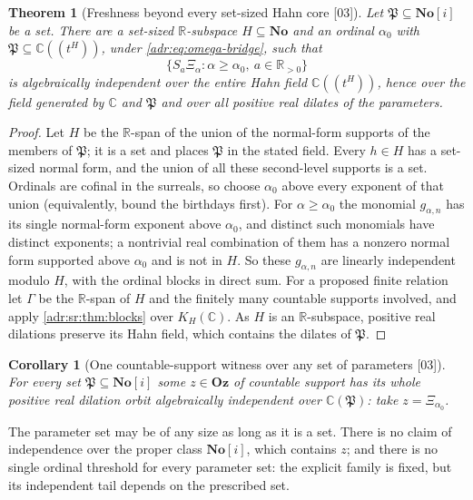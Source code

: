 \documentclass[11pt,letterpaper]{article}
\numberwithin{equation}{section}
\newtheorem{theorem}{Theorem}[section]
\newtheorem{corollary}[corollary]{Corollary}
\theoremstyle{definition}
\theoremstyle{remark}
\newcommand{\No}{\mathbf{No}}
\newcommand{\Oz}{\mathbf{Oz}}
\newcommand{\SC}{\mathbf{No}[i]}
\newcommand{\C}{\mathbb C}
\newcommand{\R}{\mathbb R}
\newcommand{\src}[1]{\textup{[#1]}}%
\begin{document}
\begin{theorem}[Freshness beyond every set-sized Hahn core \src{03}]
\label{adr:sr:thm:tail}
Let $\mathfrak P\subseteq\SC$ be a set. There are a set-sized $\R$-subspace
$H\subseteq\No$ and an ordinal $\alpha_0$ with $\mathfrak P\subseteq\C((t^H))$,
under \eqref{adr:eq:omega-bridge}, such that
\[
 \{S_a\Xi_\alpha:\alpha\ge\alpha_0,\ a\in\R_{>0}\}
\]
is algebraically independent over the \emph{entire} Hahn field $\C((t^H))$,
hence over the field generated by $\C$ and $\mathfrak P$ and over all positive
real dilates of the parameters.
\end{theorem}
\begin{proof}
Let $H$ be the $\R$-span of the union of the normal-form supports of the
members of $\mathfrak P$; it is a set and places $\mathfrak P$ in the stated
field. Every $h\in H$ has a set-sized normal form, and the union of all these
second-level supports is a set. Ordinals are cofinal in the surreals, so
choose $\alpha_0$ above every exponent of that union (equivalently, bound the
birthdays first). For $\alpha\ge\alpha_0$ the monomial $g_{\alpha,n}$ has its
single normal-form exponent above $\alpha_0$, and distinct such monomials have
distinct exponents; a nontrivial real combination of them has a nonzero normal
form supported above $\alpha_0$ and is not in $H$. So these $g_{\alpha,n}$ are
linearly independent modulo $H$, with the ordinal blocks in direct sum. For a
proposed finite relation let $\Gamma$ be the $\R$-span of $H$ and the
finitely many countable supports involved, and apply
\cref{adr:sr:thm:blocks} over $K_H(\C)$. As $H$ is an $\R$-subspace, positive
real dilations preserve its Hahn field, which contains the dilates of
$\mathfrak P$.
\end{proof}

\begin{corollary}[One countable-support witness over any set of parameters \src{03}]
\label{adr:sr:cor:witness}
For every set $\mathfrak P\subseteq\SC$ some $z\in\Oz$ of countable support has
its whole positive real dilation orbit algebraically independent over
$\C(\mathfrak P)$: take $z=\Xi_{\alpha_0}$.
\end{corollary}

The parameter set may be of any size as long as it is a set. There is no
claim of independence over the proper class $\SC$, which contains $z$; and
there is no single ordinal threshold for every parameter set: the explicit
family is fixed, but its independent tail depends on the prescribed set.
\end{document}
